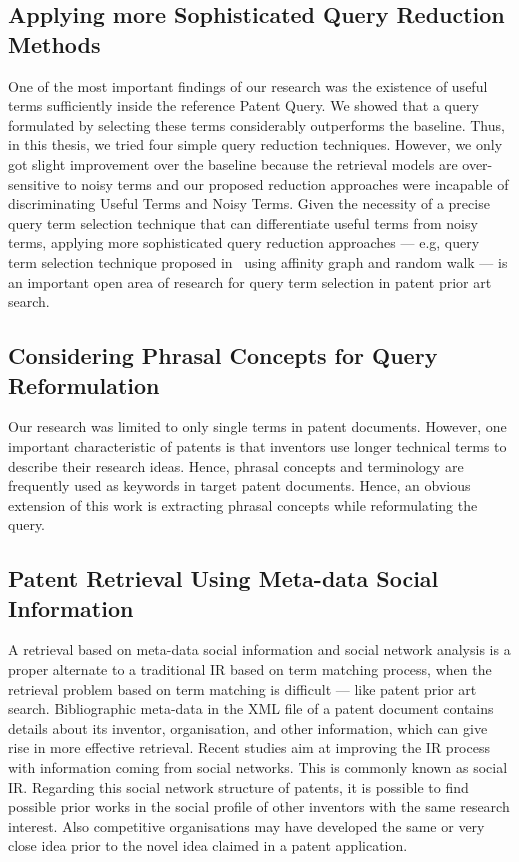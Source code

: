 \subsection{Applying more Sophisticated Query Reduction Methods}
\label{subsec:SophisticatedQueryReduction}
One of the most important findings of our research was the existence of useful terms sufficiently inside the reference Patent Query. 
We showed that a query formulated by selecting these terms considerably outperforms the baseline. 
Thus, in this thesis, we tried four simple query reduction techniques. However, we only got slight improvement over the baseline because the retrieval models are over-sensitive to noisy terms and our proposed reduction approaches were incapable of discriminating Useful Terms and Noisy Terms. 
Given the necessity of a precise query term selection technique that can differentiate useful terms from noisy terms, 
applying more sophisticated query reduction approaches --- e.g, query term selection technique proposed in~\citep{maxwell2013compact} using affinity graph and random walk --- is an important open area of research for query term selection in patent prior art search.     

\subsection{Considering Phrasal Concepts for Query Reformulation }
\label{subsec: PhraseAnalysis}
Our research was limited to only single terms in patent documents. 
However, one important characteristic of patents is that 
inventors use longer technical terms to describe their research ideas. 
Hence, phrasal concepts and terminology 
are frequently used as keywords in target patent documents.
Hence, an obvious extension of this work is extracting phrasal concepts while reformulating the query. 

\subsection{Patent Retrieval Using Meta-data Social Information}
\label{subsec: Meta-dataNetworkAnalysis}
A retrieval based on meta-data social information and social network analysis 
is a proper alternate to a traditional IR based on term matching process, 
when the retrieval problem based on term matching is difficult --- like patent prior art search.  
Bibliographic meta-data in the XML file of a patent document contains details about 
its inventor, organisation, and other information, which can give rise in more effective retrieval. 
Recent studies aim at improving the IR process with
information coming from social networks. This is commonly known as social IR. 
Regarding this social network structure of patents, it is possible to 
find possible prior works in the social profile of other inventors with the same research interest.
Also competitive organisations may have developed the same or very close idea prior to the novel 
idea claimed in a patent application.


